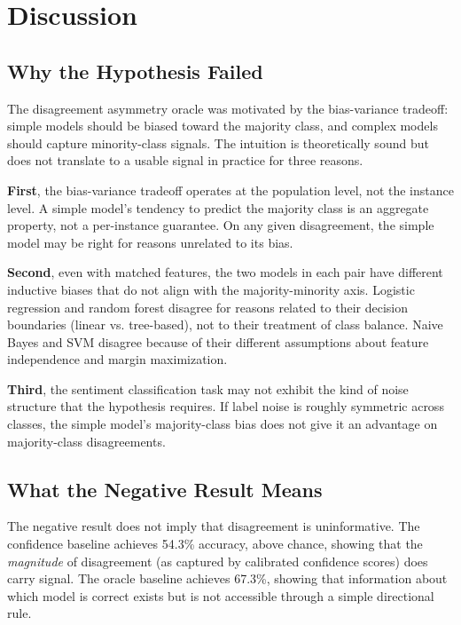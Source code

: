 \documentclass[11pt,letterpaper]{article}
\begin{document}
\section{Discussion}

\subsection{Why the Hypothesis Failed}

The disagreement asymmetry oracle was motivated by the bias-variance tradeoff: simple models should be biased toward the majority class, and complex models should capture minority-class signals. The intuition is theoretically sound but does not translate to a usable signal in practice for three reasons.

\textbf{First}, the bias-variance tradeoff operates at the population level, not the instance level. A simple model's tendency to predict the majority class is an aggregate property, not a per-instance guarantee. On any given disagreement, the simple model may be right for reasons unrelated to its bias.

\textbf{Second}, even with matched features, the two models in each pair have different inductive biases that do not align with the majority-minority axis. Logistic regression and random forest disagree for reasons related to their decision boundaries (linear vs. tree-based), not to their treatment of class balance. Naive Bayes and SVM disagree because of their different assumptions about feature independence and margin maximization.

\textbf{Third}, the sentiment classification task may not exhibit the kind of noise structure that the hypothesis requires. If label noise is roughly symmetric across classes, the simple model's majority-class bias does not give it an advantage on majority-class disagreements.

\subsection{What the Negative Result Means}

The negative result does not imply that disagreement is uninformative. The confidence baseline achieves 54.3\% accuracy, above chance, showing that the \textit{magnitude} of disagreement (as captured by calibrated confidence scores) does carry signal. The oracle baseline achieves 67.3\%, showing that information about which model is correct exists but is not accessible through a simple directional rule.
\end{document}
